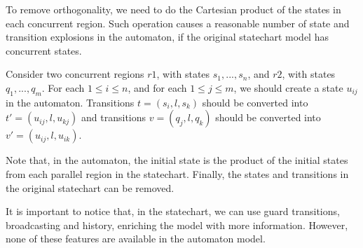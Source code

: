 To remove orthogonality, we need to do the Cartesian product of the states in each concurrent region. Such operation causes a reasonable number of state and transition explosions in the automaton, if the original statechart model has concurrent states. 

Consider two concurrent regions $r1$, with states $s_1,...,s_n$, and $r2$, with states $q_1,...,q_m$. For each $1 \leq i \leq n$, and for each $1 \leq j \leq m$, we should create a state $u_{ij}$ in the automaton. Transitions $t = (s_i,l,s_k)$ should be converted into $t' = (u_{ij},l,u_{kj})$ and transitions $v = (q_j,l,q_k)$ should be converted into $v' = (u_{ij},l,u_{ik})$.

Note that, in the automaton, the initial state is the product of the initial states from each parallel region in the statechart. Finally, the states and transitions in the original statechart can be removed.


It is important to notice that, in the statechart, we can use guard transitions, broadcasting and history, enriching the model with more information. However, none of these features are available in the automaton model.
